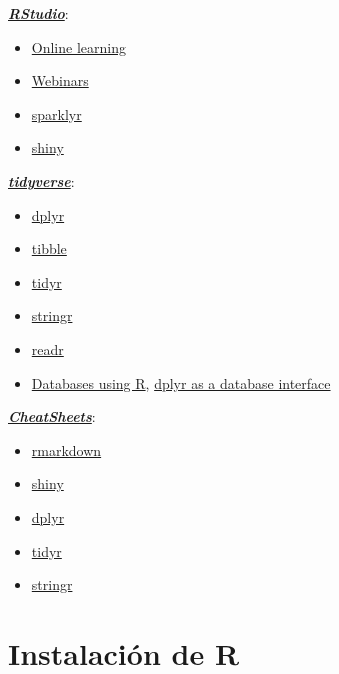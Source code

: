 \documentclass[]{book}
\begin{document}
\href{https://www.rstudio.com}{\textbf{\emph{RStudio}}}:

\begin{itemize}
\item
  \href{https://www.rstudio.com/online-learning}{Online learning}
\item
  \href{https://resources.rstudio.com/webinars}{Webinars}
\item
  \href{https://spark.rstudio.com/}{sparklyr}
\item
  \href{http://shiny.rstudio.com}{shiny}
\end{itemize}

\href{https://www.tidyverse.org/}{\textbf{\emph{tidyverse}}}:

\begin{itemize}
\item
  \href{https://dplyr.tidyverse.org}{dplyr}
\item
  \href{https://tibble.tidyverse.org}{tibble}
\item
  \href{https://tidyr.tidyverse.org}{tidyr}
\item
  \href{https://stringr.tidyverse.org}{stringr}
\item
  \href{https://readr.tidyverse.org}{readr}
\item
  \href{https://db.rstudio.com}{Databases using R},
  \href{https://db.rstudio.com/overview}{dplyr as a database interface}
\end{itemize}

\href{https://resources.rstudio.com/rstudio-cheatsheets}{\textbf{\emph{CheatSheets}}}:

\begin{itemize}
\item
  \href{https://resources.rstudio.com/rstudio-cheatsheets/rmarkdown-2-0-cheat-sheet}{rmarkdown}
\item
  \href{https://resources.rstudio.com/rstudio-cheatsheets/shiny-cheat-sheet}{shiny}
\item
  \href{https://github.com/rstudio/cheatsheets/blob/master/data-transformation.pdf}{dplyr}
\item
  \href{https://github.com/rstudio/cheatsheets/blob/master/data-import.pdf}{tidyr}
\item
  \href{https://resources.rstudio.com/rstudio-cheatsheets/stringr-cheat-sheet}{stringr}
\end{itemize}

\chapter{Instalación de R}\label{instalacion}
\end{document}
